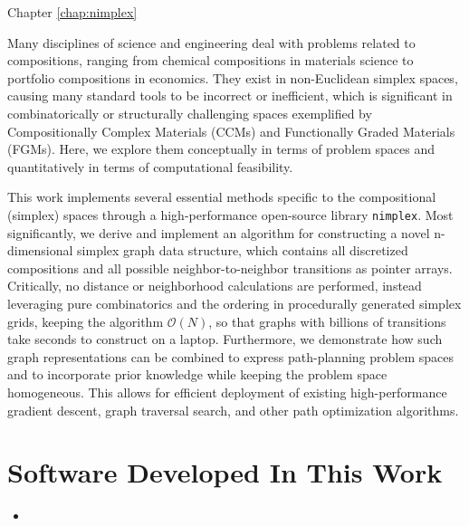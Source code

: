 Chapter \ref{chap:nimplex}

Many disciplines of science and engineering deal with problems related to compositions, ranging from chemical compositions in materials science to portfolio compositions in economics. They exist in non-Euclidean simplex spaces, causing many standard tools to be incorrect or inefficient, which is significant in combinatorically or structurally challenging spaces exemplified by Compositionally Complex Materials (CCMs) and Functionally Graded Materials (FGMs). Here, we explore them conceptually in terms of problem spaces and quantitatively in terms of computational feasibility.

This work implements several essential methods specific to the compositional (simplex) spaces through a high-performance open-source library \texttt{nimplex}. Most significantly, we derive and implement an algorithm for constructing a novel n-dimensional simplex graph data structure, which contains all discretized compositions and all possible neighbor-to-neighbor transitions as pointer arrays. Critically, no distance or neighborhood calculations are performed, instead leveraging pure combinatorics and the ordering in procedurally generated simplex grids, keeping the algorithm $\mathcal{O}(N)$, so that graphs with billions of transitions take seconds to construct on a laptop. Furthermore, we demonstrate how such graph representations can be combined to express path-planning problem spaces and to incorporate prior knowledge while keeping the problem space homogeneous. This allows for efficient deployment of existing high-performance gradient descent, graph traversal search, and other path optimization algorithms.


\section{Software Developed In This Work} \label{intro:sec:software}


\begin{itemize}
    \item 
\end{itemize}



\printbibliography[heading=subbibintoc]